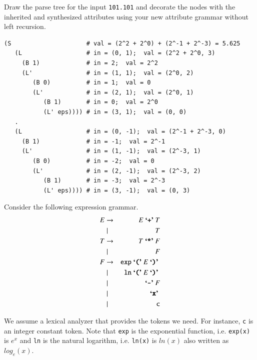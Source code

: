 \documentclass[12pt]{article}
\newcommand{\ident}[1]{\texttt{#1}}
\newcommand{\termchar}[1]{\mbox{\textbf{`\texttt{#1}'}\ }}
\begin{document}
\begin{exe}
\begin{xlist}
{\ex\label{exleftrec} Draw the parse tree for the input {\tt 101.101} and decorate the nodes with
the inherited and synthesized attributes using your new attribute grammar
without left recursion.
  \begin{soln}
  {\small
  \begin{verbatim}
(S                     # val = (2^2 + 2^0) + (2^-1 + 2^-3) = 5.625
   (L                  # in = (0, 1);  val = (2^2 + 2^0, 3)
     (B 1)             # in = 2;  val = 2^2
     (L'               # in = (1, 1);  val = (2^0, 2)
        (B 0)          # in = 1;  val = 0
        (L'            # in = (2, 1);  val = (2^0, 1)
           (B 1)       # in = 0;  val = 2^0
           (L' eps)))) # in = (3, 1);  val = (0, 0)
   .
   (L                  # in = (0, -1);  val = (2^-1 + 2^-3, 0)
     (B 1)             # in = -1;  val = 2^-1
     (L'               # in = (1, -1);  val = (2^-3, 1)
        (B 0)          # in = -2;  val = 0
        (L'            # in = (2, -1);  val = (2^-3, 2)
           (B 1)       # in = -3;  val = 2^-3
           (L' eps)))) # in = (3, -1);  val = (0, 3)
  \end{verbatim}
  }
  \end{soln}
}

\end{xlist}

\newpage

\ex\label{dv} Consider the following expression grammar.
  \begin{eqnarray}
  E & \rightarrow & E\ \termchar{+} T \nonumber\\
  & \mid & T \nonumber\\
  T & \rightarrow & T\ \termchar{*} F \nonumber\\
  & \mid & F \nonumber\\
  F & \rightarrow & \ident{exp}\ \termchar{(} E\ \termchar{)} \nonumber\\
  & \mid & \ident{ln}\ \termchar{(} E\ \termchar{)} \nonumber\\
  & \mid & \termchar{-} F \nonumber\\
  & \mid & \termchar{x} \nonumber\\
  & \mid & \ident{c} \nonumber
  \end{eqnarray}
  
We assume a lexical analyzer that provides the tokens we need. 
For instance, \ident{c} is an integer constant token. Note that 
\ident{exp} is the exponential function, i.e. \texttt{exp(x)} is $e^x$
and \ident{ln} is the natural logarithm, i.e. \texttt{ln(x)} is 
$\textit{ln}(x)$ also written as $\textit{log}_e(x)$.


\end{exe}
\end{document}
